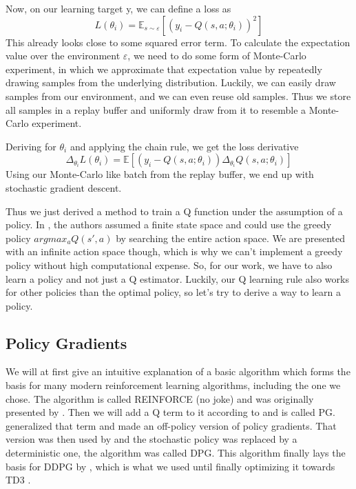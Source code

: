 \documentclass[hyperref,german,beleg]{cgvpub}
\begin{document}
Now, on our learning target y, we can define a loss as
\begin{equation}
L(\theta_i) = \mathbb{E}_{s \sim \varepsilon}[(y_i - Q(s, a;\theta_i))^2]
\end{equation}
This already looks close to some squared error term. To calculate the expectation value over the environment $\varepsilon$, we need to do some form of Monte-Carlo experiment, in which we approximate that expectation value by repeatedly drawing samples from the underlying distribution. Luckily, we can easily draw samples from our environment, and we can even reuse old samples. Thus we store all samples in a replay buffer and uniformly draw from it to resemble a Monte-Carlo experiment. 

Deriving for $\theta_i$ and applying the chain rule, we get the loss derivative
\begin{equation}
\Delta_{\theta_i} L(\theta_i) = \mathbb{E}[(y_i - Q(s, a;\theta_i))\Delta_{\theta_i}Q(s, a;\theta_i)]
\end{equation}
Using our Monte-Carlo like batch from the replay buffer, we end up with stochastic gradient descent.

Thus we just derived a method to train a Q function under the assumption of a policy. In \cite{mnihPlayingAtariDeep2013}, the authors assumed a finite state space and could use the greedy policy $argmax_a Q(s', a)$ by searching the entire action space. We are presented with an infinite action space though, which is why we can't implement a greedy policy without high computational expense. So, for our work, we have to also learn a policy and not just a Q estimator. Luckily, our Q learning rule also works for other policies than the optimal policy, so let's try to derive a way to learn a policy.


\subsection{Policy Gradients}

We will at first give an intuitive explanation of a basic algorithm which forms the basis for many modern reinforcement learning algorithms, including the one we chose. The algorithm is called \ac{REINFORCE} (no joke) and was originally presented by \cite{williamsSimpleStatisticalGradientfollowing}. Then we will add a Q term to it according to \cite{suttonPolicyGradientMethods} and is called \ac{PG}. \cite{degrisOffPolicyActorCritic2013} generalized that term and made an off-policy version of policy gradients. That version was then used by \cite{silverDeterministicPolicyGradient2013} and the stochastic policy was replaced by a deterministic one, the algorithm was called \ac{DPG}. This algorithm finally lays the basis for \ac{DDPG} by \cite{lillicrapCONTINUOUSCONTROLDEEP2015}, which is what we used until finally optimizing it towards \ac{TD3} \cite{fujimotoAddressingFunctionApproximation2018}.
\end{document}
